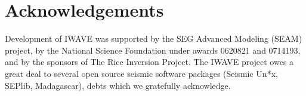 
\section{Acknowledgements}
Development of IWAVE was supported by the SEG Advanced Modeling (SEAM) project, by the National Science Foundation under awards 0620821 and 0714193, and by the sponsors of The Rice Inversion Project. The IWAVE project owes a great deal to several open source seismic software packages (Seismic Un*x, SEPlib, Madagascar), debts which we gratefully acknowledge.
 





